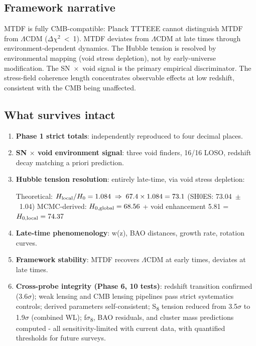 \documentclass[11pt,a4paper]{article}
\begin{document}
\subsection{Framework narrative}
\begin{mdframed}[linecolor=accent,linewidth=0.5pt,backgroundcolor=callout-bg,leftline=true,rightline=true,topline=true,bottomline=true,innerleftmargin=8pt,innerrightmargin=8pt,innertopmargin=6pt,innerbottommargin=6pt]
MTDF is fully CMB-compatible: Planck TTTEEE cannot distinguish MTDF from $\Lambda$CDM ($\Delta$$\chi$$^{2}$~<~1). MTDF deviates from $\Lambda$CDM at late times through environment-dependent dynamics. The Hubble tension is resolved by environmental mapping (void stress depletion), not by early-universe modification. The SN~$\times$~void signal is the primary empirical discriminator. The stress-field coherence length concentrates observable effects at low redshift, consistent with the CMB being unaffected.
\end{mdframed}

\subsection{What survives intact}
\begin{enumerate}
  \item \textbf{Phase 1 strict totals}: independently reproduced to four decimal places.
  \item \textbf{SN $\times$ void environment signal}: three void finders, 16/\allowbreak{}16 LOSO, redshift decay matching a priori prediction.
  \item \textbf{Hubble tension resolution}: entirely late-time, via void stress depletion:
    
Theoretical: \( H_{\rm local}/H_0 = 1.084 \;\Rightarrow\; 67.4 \times 1.084 = 73.1 \) (SH0ES: 73.04~$\pm$~1.04)
MCMC-derived: \( H_{0,\rm global} = 68.56 \) + void enhancement 5.81 = \( H_{0,\rm local} = 74.37 \)
  \item \textbf{Late-time phenomenology}: w(z), BAO distances, growth rate, rotation curves.
  \item \textbf{Framework stability}: MTDF recovers $\Lambda$CDM at early times, deviates at late times.
  \item \textbf{Cross-probe integrity (Phase 6, 10 tests)}: redshift transition confirmed (3.6$\sigma$); weak lensing and CMB lensing pipelines pass strict systematics controls; derived parameters self-consistent; S\textsubscript{8} tension reduced from 3.5$\sigma$ to 1.9$\sigma$ (combined WL); f$\sigma$\textsubscript{8}, BAO residuals, and cluster mass predictions computed  -  all sensitivity-limited with current data, with quantified thresholds for future surveys.
\end{enumerate}
\end{document}
